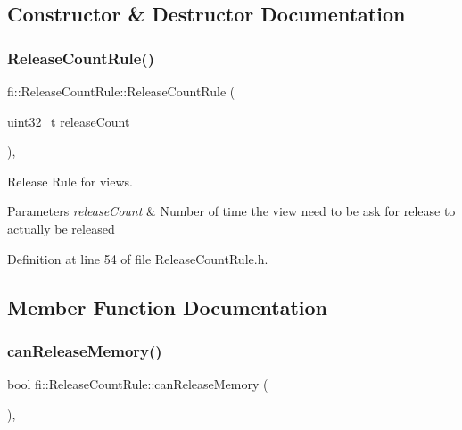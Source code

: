 \subsection{Constructor \& Destructor Documentation}
\mbox{\label{classfi_1_1ReleaseCountRule_afa61c9e8da9b8710c3b8ccfd159f9bab}} 
\subsubsection{\texorpdfstring{Release\+Count\+Rule()}{ReleaseCountRule()}}
{\footnotesize\ttfamily fi\+::\+Release\+Count\+Rule\+::\+Release\+Count\+Rule (\begin{DoxyParamCaption}\item[{uint32\+\_\+t}]{release\+Count }\end{DoxyParamCaption})\hspace{0.3cm}{\ttfamily [inline]}, {\ttfamily [explicit]}}



Release Rule for views. 


\begin{DoxyParams}{Parameters}
{\em release\+Count} & Number of time the view need to be ask for release to actually be released \\
\hline
\end{DoxyParams}


Definition at line 54 of file Release\+Count\+Rule.\+h.



\subsection{Member Function Documentation}
\mbox{\label{classfi_1_1ReleaseCountRule_abfe693ebddb1e75e8149489df2ed867a}} 
\subsubsection{\texorpdfstring{can\+Release\+Memory()}{canReleaseMemory()}}
{\footnotesize\ttfamily bool fi\+::\+Release\+Count\+Rule\+::can\+Release\+Memory (\begin{DoxyParamCaption}{ }\end{DoxyParamCaption})\hspace{0.3cm}{\ttfamily [inline]}, {\ttfamily [override]}}



